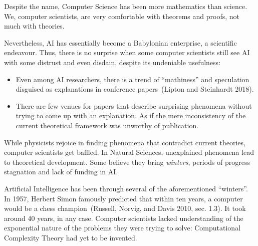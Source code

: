 \documentclass[
  letterpaper,
  a4paper,
  12pt,
  twoside,
  brazil,
  british,
  open=right]{scrbook}
\begin{document}
Despite the name, Computer Science has been more mathematics than
science. We, computer scientists, are very comfortable with theorems and
proofs, not much with theories.

Nevertheless, {AI} has essentially become a Babylonian enterprise, a
scientific endeavour. Thus, there is no surprise when some computer
scientists still see AI with some distrust and even disdain, despite its
undeniable usefulness:

\begin{itemize}
\item
  Even among AI researchers, there is a trend of ``mathiness'' and
  speculation disguised as explanations in conference papers~(Lipton and
  Steinhardt
  2018).
\item
  There are few venues for papers that describe surprising phenomena
  without trying to come up with an explanation. As if the mere
  inconsistency of the current theoretical framework was unworthy of
  publication.
\end{itemize}

While physicists rejoice in finding phenomena that contradict current
theories, computer scientists get baffled. In Natural Sciences,
unexplained phenomena lead to theoretical development. Some believe they
bring \emph{winters}, periods of progress stagnation and lack of funding
in {AI}.

Artificial Intelligence has been through several of the aforementioned
``winters''. In 1957, Herbert Simon famously predicted that within
ten years, a computer would be a chess champion~(Russell, Norvig, and
Davis 2010, sec.
1.3).
It took around 40 years, in any case. Computer scientists lacked
understanding of the exponential nature of the problems they were trying
to solve: Computational Complexity Theory had yet to be invented.
\end{document}
